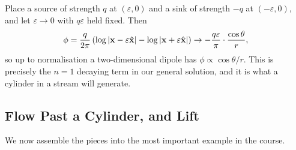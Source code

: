 \documentclass[a4paper]{scrartcl}
\newcommand{\hh}[1]{\hat{\vv{#1}}}
\begin{document}
\begin{example}
	Place a source of strength $q$ at $(\varepsilon, 0)$ and a sink of strength $-q$ at $(-\varepsilon, 0)$, and let $\varepsilon \to 0$ with $q\varepsilon$ held fixed. Then
	$$
	\phi = \frac{q}{2\pi}\left(\log|\vv x - \varepsilon\hh x| - \log|\vv x + \varepsilon \hh x|\right) \to -\frac{q\varepsilon}{\pi}\cdot\frac{\cos\theta}{r},
	$$
	so up to normalisation a two-dimensional dipole has $\phi \propto \cos\theta/r$. This is precisely the $n = 1$ decaying term in our general solution, and it is what a cylinder in a stream will generate.
\end{example}

\subsection{Flow Past a Cylinder, and Lift}

We now assemble the pieces into the most important example in the course.
\end{document}
